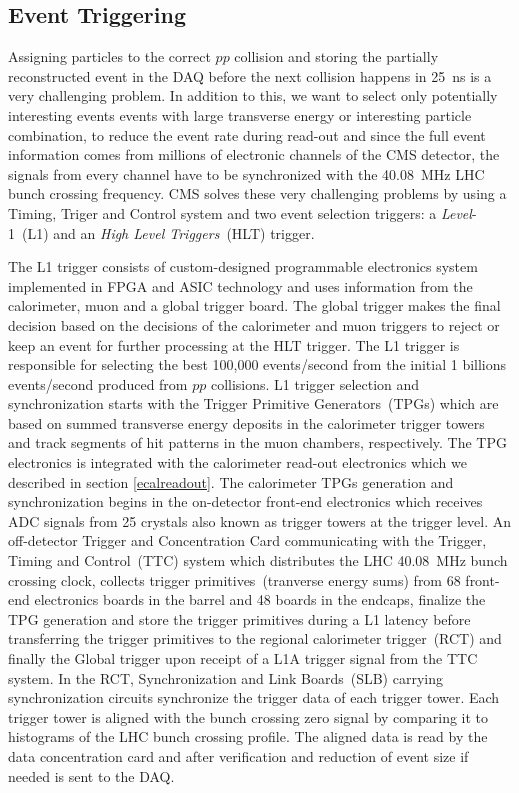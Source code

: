\subsection{Event Triggering}
Assigning particles to the correct $pp$ collision  and storing the partially reconstructed event in the DAQ before the next collision happens in 25~ns is a very challenging problem. In addition to this, we want to select only potentially interesting events \ie events with large transverse energy or interesting particle combination, to reduce the event rate during read-out and since the full event information comes from  millions of electronic channels of the CMS detector, the signals from every channel have to be synchronized with the 40.08~MHz LHC bunch crossing frequency. CMS solves these very challenging problems by using a Timing, Triger and Control system and two event selection triggers: a \textit{Level}-1~(L1) and an \textit{High Level Triggers}~(HLT) trigger. 
\par 
The L1 trigger consists of custom-designed programmable electronics system implemented in FPGA and ASIC technology and uses information from the calorimeter, muon and a global trigger board. The global trigger makes the final decision based on the decisions of the calorimeter and muon triggers to reject or keep an event for further processing at the HLT trigger. The L1 trigger is responsible for selecting the best 100,000 events/second from the initial 1 billions events/second produced from $pp$ collisions.
L1 trigger selection and synchronization starts with the Trigger Primitive Generators~(TPGs) which are based on summed transverse energy deposits in the calorimeter trigger towers and track segments of hit patterns in the muon chambers, respectively. The TPG electronics is integrated with the calorimeter read-out electronics which we described in section \ref{ecalreadout}. 
\newline
The calorimeter TPGs generation and synchronization begins in the on-detector front-end electronics which receives ADC signals from 25 crystals also known as trigger towers at the trigger level. An off-detector Trigger and Concentration Card communicating with the Trigger, Timing and Control~(TTC) system which distributes the LHC 40.08~MHz bunch crossing clock, collects trigger primitives~(tranverse energy sums) from 68 front-end electronics boards in the barrel and 48 boards in the endcaps, finalize the TPG generation and store the trigger primitives during a L1 latency before transferring the trigger primitives to the regional calorimeter trigger~(RCT) and finally the Global trigger upon receipt of a L1A trigger signal from the TTC system. In the RCT, Synchronization and Link Boards~(SLB) carrying synchronization circuits synchronize the trigger data of each trigger tower. Each trigger tower is aligned with the bunch crossing zero signal by comparing it to histograms of the LHC bunch crossing profile. The aligned data is read by the data concentration card and after verification and reduction of event size if needed is sent to the DAQ. 
